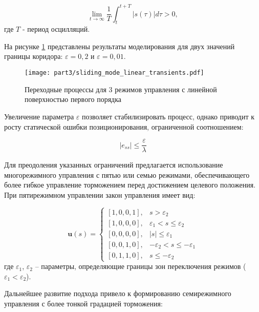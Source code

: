 \begin{equation*}
	\lim_{t \to \infty} \frac{1}{T}\int_t^{t+T} |s(\tau)| d\tau > 0,
\end{equation*}
где $T$ - период осцилляций.

На рисунке \ref{fig:ch3:transient_comparison_linear_mode3} представлены результаты моделирования
для двух значений границы коридора: $\varepsilon = 0,2$ и $\varepsilon = 0,01$.

\begin{figure}[h]
	\centering
	\texttt{[image: part3/sliding\_mode\_linear\_transients.pdf]}
	\caption{Переходные процессы для 3 режимов управления с линейной поверхностью первого порядка}
	\label{fig:ch3:transient_comparison_linear_mode3}
\end{figure}

Увеличение параметра $\varepsilon$ позволяет стабилизировать процесс, однако приводит к
росту статической ошибки позиционирования, ограниченной соотношением:

\begin{equation*}
	|e_{ss}| \leq \frac{\varepsilon}{\lambda}
\end{equation*}

Для преодоления указанных ограничений предлагается использование многорежимного управления
с пятью или семью режимами, обеспечивающего более гибкое управление торможением
перед достижением целевого положения. При пятирежимном управлении закон управления имеет вид:

\begin{equation}\label{eq:control_law_5_mode}
	\mathbf{u}(s) = \begin{cases}
		[1,0,0,1], & s > \varepsilon_2                      \\
		[1,0,0,0], & \varepsilon_1 < s \leq \varepsilon_2   \\
		[0,0,0,0], & |s| \leq \varepsilon_1                 \\
		[0,0,1,0], & -\varepsilon_2 < s \leq -\varepsilon_1 \\
		[0,1,1,0], & s \leq -\varepsilon_2
	\end{cases}
\end{equation}
где $\varepsilon_1$, $\varepsilon_2$ -- параметры, определяющие границы зон переключения режимов ($\varepsilon_1 < \varepsilon_2$).

Дальнейшее развитие подхода привело к формированию семирежимного управления с более тонкой градацией торможения:

